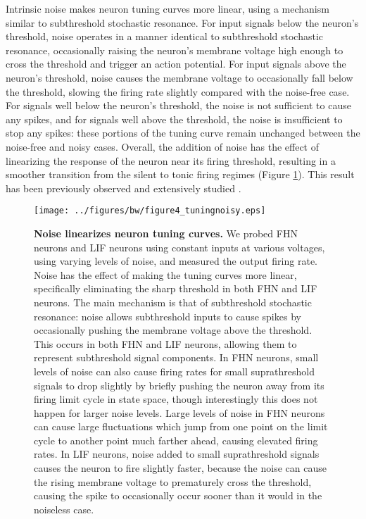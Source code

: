 \documentclass[12pt]{article}
\newcommand{\fig}[1]{Figure \ref{fig:#1}}
\newcommand{\figlabel}[1]{\label{fig:#1}}
\begin{document}
Intrinsic noise makes neuron tuning curves more linear, using a mechanism similar to subthreshold stochastic resonance. For input signals below the neuron's threshold, noise operates in a manner identical to subthreshold stochastic resonance, occasionally raising the neuron's membrane voltage high enough to cross the threshold and trigger an action potential. For input signals above the neuron's threshold, noise causes the membrane voltage to occasionally fall below the threshold, slowing the firing rate slightly compared with the noise-free case. For signals well below the neuron's threshold, the noise is not sufficient to cause any spikes, and for signals well above the threshold, the noise is insufficient to stop any spikes: these portions of the tuning curve remain unchanged between the noise-free and noisy cases. Overall, the addition of noise has the effect of linearizing the response of the neuron near its firing threshold, resulting in a smoother transition from the silent to tonic firing regimes (\fig{tuning}). This result has been previously observed and extensively studied \citep{Stocks1996,Chialvo1997}.

\begin{figure}
  \ifx\hidefigures\undefined
    \centering
    \texttt{[image: ../figures/bw/figure4\_tuningnoisy.eps]}
  \fi
  \caption{
    \textbf{Noise linearizes neuron tuning curves.} We probed FHN neurons and LIF neurons using constant inputs at various voltages, using varying levels of noise, and measured the output firing rate. Noise has the effect of making the tuning curves more linear, specifically eliminating the sharp threshold in both FHN and LIF neurons. The main mechanism is that of subthreshold stochastic resonance: noise allows subthreshold inputs to cause spikes by occasionally pushing the membrane voltage above the threshold. This occurs in both FHN and LIF neurons, allowing them to represent subthreshold signal components. In FHN neurons, small levels of noise can also cause firing rates for small suprathreshold signals to drop slightly by briefly pushing the neuron away from its firing limit cycle in state space, though interestingly this does not happen for larger noise levels. Large levels of noise in FHN neurons can cause large fluctuations which jump from one point on the limit cycle to another point much farther ahead, causing elevated firing rates. In LIF neurons, noise added to small suprathreshold signals causes the neuron to fire slightly faster, because the noise can cause the rising membrane voltage to prematurely cross the threshold, causing the spike to occasionally occur sooner than it would in the noiseless case.
  }
  \figlabel{tuning}
\end{figure}
\end{document}
